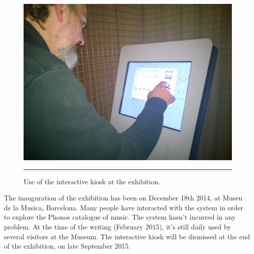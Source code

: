\begin{figure}[htbp]
\begin{center}
\includegraphics[scale=0.1]{Figures/kiosk2.jpg}
    \rule{20em}{0.5pt}
  \caption[Interactive kiosk at the exhibition]{Use of the interactive kiosk at the exhibition.}
  \label{fig:kiosk}
\end{center}
\end{figure}
The inauguration of the exhibition has been on December 18th 2014, at Museu de la Musica, Barcelona. Many people have interacted with the system in order to explore the Phonos catalogue of music. The system hasn't incurred in any problem. At the time of the writing (February 2015), it's still daily used by several visitors at the Museum. The interactive kiosk will be dismissed at the end of the exhibition, on late September 2015.\\
